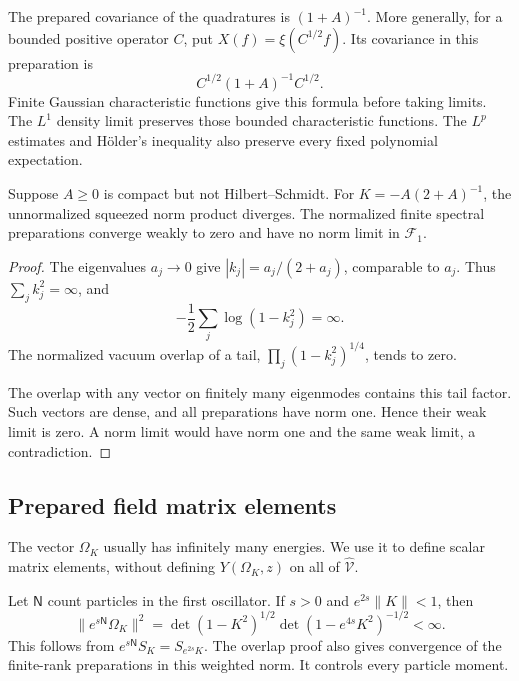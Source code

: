 The prepared covariance of the quadratures is
\((1+A)^{-1}\). More generally, for a bounded
positive operator \(C\), put \(X(f)=\xi(C^{1/2}f)\).
Its covariance in this preparation is
\[
                     C^{1/2}(1+A)^{-1}C^{1/2}.
\]
Finite Gaussian characteristic functions give this
formula before taking limits. The \(L^1\) density
limit preserves those bounded characteristic functions.
The \(L^p\) estimates and Hölder's inequality also
preserve every fixed polynomial expectation.

\begin{proposition}\label{v4-prop:singular-non-HS-preparation}
Suppose \(A\geq0\) is compact but not Hilbert--Schmidt.
For \(K=-A(2+A)^{-1}\), the unnormalized squeezed
norm product diverges. The normalized finite
spectral preparations converge weakly to zero
and have no norm limit in \(\mathcal F_1\).
\end{proposition}

\begin{proof}
The eigenvalues \(a_j\to0\) give
\(|k_j|=a_j/(2+a_j)\), comparable to \(a_j\).
Thus \(\sum_jk_j^2=\infty\), and
\[
                  -\frac12\sum_j\log(1-k_j^2)=\infty.
\]
The normalized vacuum overlap of a tail,
\(\prod_j(1-k_j^2)^{1/4}\), tends to zero.

The overlap with any vector on finitely
many eigenmodes contains this tail factor.
Such vectors are dense, and all preparations
have norm one. Hence their weak limit is zero.
A norm limit would have norm one and the same
weak limit, a contradiction.
\end{proof}

\subsection{Prepared field matrix elements}

The vector \(\Omega_K\) usually has infinitely
many energies. We use it to define scalar
matrix elements, without defining \(Y(\Omega_K,z)\)
on all of \(\widehat{\mathcal V}\).

Let \(\mathsf N\) count particles in the first
oscillator. If \(s>0\) and \(e^{2s}\|K\|<1\), then
\begin{equation}\label{v4-eq:singular-prepared-number-bound}
 \|e^{s\mathsf N}\Omega_K\|^2
       =\det(1-K^2)^{1/2}
          \det(1-e^{4s}K^2)^{-1/2}<\infty.
\end{equation}
This follows from \(e^{s\mathsf N}S_K=S_{e^{2s}K}\).
The overlap proof also gives convergence of the
finite-rank preparations in this weighted norm.
It controls every particle moment.

